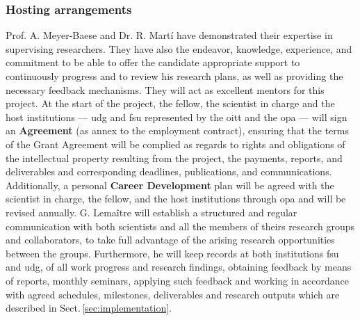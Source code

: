 

\subsubsection*{Hosting arrangements}

Prof. A. Meyer-Baese and Dr. R. Mart\'i have demonstrated their expertise in supervising researchers.
They have also the endeavor, knowledge, experience, and commitment to be able to offer the candidate appropriate support to continuously progress and to review his research plans, as well as providing the necessary feedback mechanisms.
They will act as excellent mentors for this project.
At the start of the project, the fellow, the scientist in charge and the host institutions --- \ac{udg} and \ac{fsu} represented by the \ac{oitt} and the \ac{opa} --- will sign an \textbf{Agreement} (as annex to the employment contract), ensuring that the terms of the Grant Agreement will be complied as regards to rights and obligations of the intellectual property resulting from the project, the payments, reports, and deliverables and corresponding deadlines, publications, and communications.
Additionally, a personal \textbf{Career Development} plan will be agreed with the scientist in charge, the fellow, and the host institutions through \ac{opa} and will be revised annually.
G. Lema\^itre will establish a structured and regular communication with both scientists and all the members of theirs research groups and collaborators, to take full advantage of the arising research opportunities between the groups.
Furthermore, he will keep records at both institutions \ac{fsu} and \ac{udg}, of all work progress and research findings, obtaining feedback by means of reports, monthly seminars, applying such feedback and working in accordance with agreed schedules, milestones, deliverables and research outputs which are described in Sect.\,\ref{sec:implementation}.

